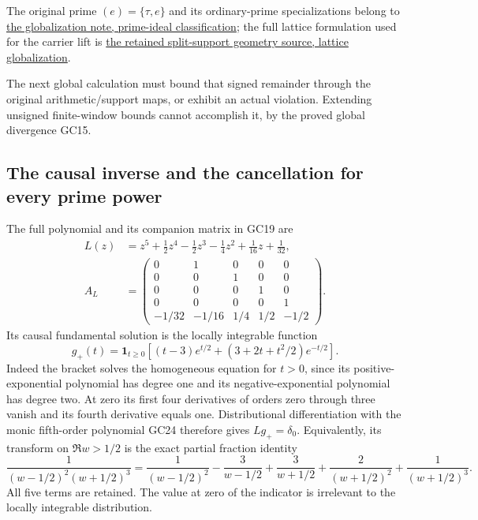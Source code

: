 The original prime \((e)=\{\tau,e\}\) and its ordinary-prime
specializations belong to
\href{https://github.com/KokunoYumeto/zeta-function-research-reader/blob/d2f0020a7c446f429682925c1c682d99ba86a4cc/workbenches/splitzero-tandem/foundations/globalization-semiring/globalization_note.tex}{the globalization note, prime-ideal classification};
the full lattice formulation used for the carrier lift is
\href{https://github.com/KokunoYumeto/zeta-function-research-reader/blob/a2851f9eb352e7e4376bc629de86fa4ed9c1c434/workbenches/splitzero-tandem/foundations/split-support-geometry-v11/split_support_geometry_arithmetic_curve_v11.tex}{the retained split-support geometry source, lattice globalization}.

The next global calculation must bound that signed remainder through
the original arithmetic/support maps, or exhibit an actual violation.
Extending unsigned finite-window bounds cannot accomplish it, by
the proved global divergence GC15.

\subsection{The causal inverse and the cancellation for every prime power}

The full polynomial and its companion matrix in GC19 are
\[
\begin{split}
L(z)&=z^5+\tfrac12z^4-\tfrac12z^3-\tfrac14z^2
                  +\tfrac1{16}z+\tfrac1{32},\\
A_L&=\begin{pmatrix}
0&1&0&0&0\\0&0&1&0&0\\0&0&0&1&0\\0&0&0&0&1\\
-1/32&-1/16&1/4&1/2&-1/2
\end{pmatrix}.
\end{split}\tag{GC24}
\]
Its causal fundamental solution is the locally integrable function
\[
g_+(t)=\mathbf1_{t\ge0}
 \left[(t-3)e^{t/2}+(3+2t+t^2/2)e^{-t/2}\right].\tag{GC25}
\]
Indeed the bracket solves the homogeneous equation for \(t>0\),
since its positive-exponential polynomial has degree one and its
negative-exponential polynomial has degree two. At zero its first
four derivatives of orders zero through three vanish and its fourth
derivative equals one. Distributional differentiation with the monic
fifth-order polynomial GC24 therefore gives \(Lg_+=\delta_0\).
Equivalently, its transform on \(\Re w>1/2\) is the exact partial
fraction identity
\[
\frac1{(w-1/2)^2(w+1/2)^3}
=\frac1{(w-1/2)^2}-\frac3{w-1/2}
 +\frac3{w+1/2}+\frac2{(w+1/2)^2}+\frac1{(w+1/2)^3}.
\tag{GC26}
\]
All five terms are retained. The value at zero of the indicator is
irrelevant to the locally integrable distribution.

